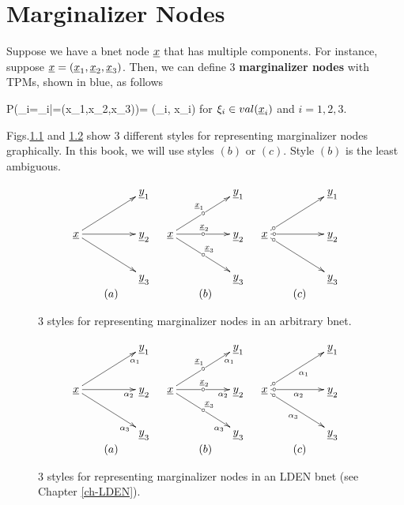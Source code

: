 \chapter{Marginalizer Nodes}
\label{ch-marginalizer}

Suppose we have a bnet node $\rvx$
that has multiple components.
For instance, suppose
$\rvx=(\rvx_1, \rvx_2, \rvx_3)$.
Then, we can define 
3 {\bf marginalizer nodes}
with TPMs, shown in blue, as follows

\beq\color{blue}
P(\rvx_i=\xi_i|\rvx=(x_1,x_2,x_3))= \delta(\xi_i, x_i)
\eeq
for $\xi_i\in val(\rvx_i)$
and $i=1,2,3$.

Figs.\ref{fig-marginalizer}
and \ref{fig-marginalizer-lden}
show 3 different
styles for representing
marginalizer nodes graphically.
In this book,
we will use styles $(b)$ or $(c)$.
Style $(b)$ is the least 
ambiguous.

\begin{figure}[h!]
$$
\begin{array}{ccc}
\xymatrix@C=4pc{
&\rvy_1
\\
\rvx\ar[ru]
\ar[r]
\ar[rd]
&\rvy_2
\\
&\rvy_3
}
&
\xymatrix@C=4pc{
&\rvy_1
\\
\rvx\ar[ru]|-\circ^{\rvx_1}
\ar[r]|-\circ^{\rvx_2}
\ar[rd]|-\circ^{\rvx_3}
&\rvy_2
\\
&\rvy_3
}
&
\xymatrix@C=4pc{
&\rvy_1
\\
\rvx\ar[ru]|-<\circ
\ar[r]|-<\circ
\ar[rd]|-<\circ
&\rvy_2
\\
&\rvy_3
}
\\
(a)&(b)&(c)
\end{array}
$$
\caption{3 styles
for representing marginalizer nodes
in an arbitrary bnet.}
\label{fig-marginalizer}
\end{figure}


\begin{figure}[h!]
$$
\begin{array}{ccc}
\xymatrix@C=4pc{
&\rvy_1
\\
\rvx\ar[ru]_>>>{\alpha_1}
\ar[r]_>>>{\alpha_2}
\ar[rd]_>>>{\alpha_3}
&\rvy_2
\\
&\rvy_3
}
&
\xymatrix@C=4pc{
&\rvy_1
\\
\rvx\ar[ru]_>>>{\alpha_1}|-\circ^{\rvx_1}
\ar[r]_>>>{\alpha_2}|-\circ^{\rvx_2}
\ar[rd]_>>>{\alpha_3}|-\circ^{\rvx_3}
&\rvy_2
\\
&\rvy_3
}
&
\xymatrix@C=4pc{
&\rvy_1
\\
\rvx\ar[ru]_{\alpha_1}|-<\circ
\ar[r]_{\alpha_2}|-<\circ
\ar[rd]_{\alpha_3}|-<\circ
&\rvy_2
\\
&\rvy_3
}
\\
(a)&(b)&(c)
\end{array}
$$
\caption{3 styles
for representing marginalizer nodes
in an LDEN bnet (see Chapter \ref{ch-LDEN}).}
\label{fig-marginalizer-lden}
\end{figure}

